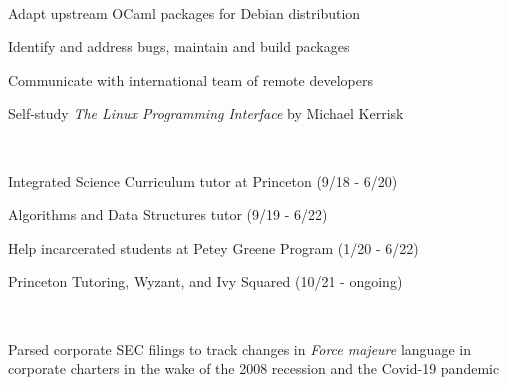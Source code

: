 \documentclass[a4paper]{MagicalCV}
\begin{document}
\begin{minipage}[t]{0.66\textwidth} 



 \\
\vspace{\topsep} %
\begin{tightemize}
\item Adapt upstream OCaml packages for Debian distribution
\item Identify and address bugs, maintain and build packages
\item Communicate with international team of remote developers
\item Self-study \textit{The Linux Programming Interface} by Michael Kerrisk
\end{tightemize}
\sectionsep

 \\
\vspace{\topsep} %
\begin{tightemize}
\item Integrated Science Curriculum tutor at Princeton (9/18 - 6/20)
\item Algorithms and Data Structures tutor (9/19 - 6/22)
\item Help incarcerated students at Petey Greene Program (1/20 - 6/22)
\item Princeton Tutoring, Wyzant, and Ivy Squared (10/21 - ongoing)
\end{tightemize}
\sectionsep

 \\
\vspace{\topsep} %
\begin{tightemize}
\item Parsed corporate SEC filings to track changes in \textit{Force majeure} language in corporate charters in the wake of the 2008 recession and the Covid-19 pandemic
\end{tightemize}
\sectionsep


\end{minipage}
\end{document}
